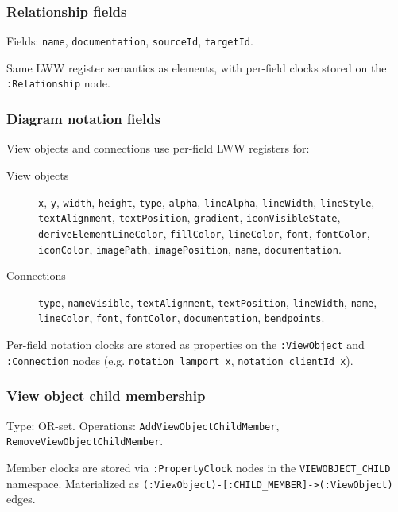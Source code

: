 \subsubsection{Relationship fields}

Fields: \texttt{name}, \texttt{documentation}, \texttt{sourceId},
\texttt{targetId}.

Same LWW register semantics as elements, with per-field clocks stored on the
\texttt{:Relationship} node.

\subsubsection{Diagram notation fields}

View objects and connections use per-field LWW registers for:

\begin{description}
\item[View objects] \texttt{x}, \texttt{y}, \texttt{width}, \texttt{height},
  \texttt{type}, \texttt{alpha}, \texttt{lineAlpha}, \texttt{lineWidth},
  \texttt{lineStyle}, \texttt{textAlignment}, \texttt{textPosition},
  \texttt{gradient}, \texttt{iconVisibleState},
  \texttt{deriveElementLineColor}, \texttt{fillColor}, \texttt{lineColor},
  \texttt{font}, \texttt{fontColor}, \texttt{iconColor},
  \texttt{imagePath}, \texttt{imagePosition}, \texttt{name},
  \texttt{documentation}.
\item[Connections] \texttt{type}, \texttt{nameVisible},
  \texttt{textAlignment}, \texttt{textPosition}, \texttt{lineWidth},
  \texttt{name}, \texttt{lineColor}, \texttt{font}, \texttt{fontColor},
  \texttt{documentation}, \texttt{bendpoints}.
\end{description}

Per-field notation clocks are stored as properties on the
\texttt{:ViewObject} and \texttt{:Connection} nodes (e.g.
\texttt{notation\_lamport\_x}, \texttt{notation\_clientId\_x}).

\subsubsection{View object child membership}

Type: OR-set. Operations: \texttt{AddViewObjectChildMember},
\texttt{RemoveViewObjectChildMember}.

Member clocks are stored via \texttt{:PropertyClock} nodes in the
\texttt{VIEWOBJECT\_CHILD} namespace. Materialized as
\texttt{(:ViewObject)-[:CHILD\_MEMBER]->(:ViewObject)} edges.

